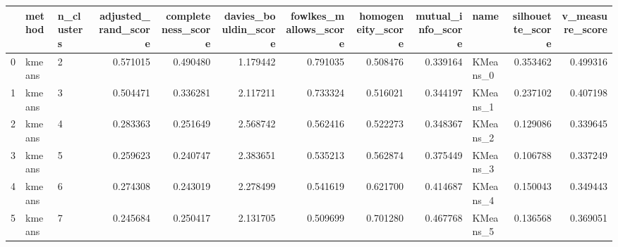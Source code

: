\begin{tabular}{lllrrrrrrlrr}
\toprule
{} &  method & n\_clusters &  adjusted\_rand\_score &  completeness\_score &  davies\_bouldin\_score &  fowlkes\_mallows\_score &  homogeneity\_score &  mutual\_info\_score &      name &  silhouette\_score &  v\_measure\_score \\
\midrule
0 &  kmeans &          2 &             0.571015 &            0.490480 &              1.179442 &               0.791035 &           0.508476 &           0.339164 &  KMeans\_0 &          0.353462 &         0.499316 \\
1 &  kmeans &          3 &             0.504471 &            0.336281 &              2.117211 &               0.733324 &           0.516021 &           0.344197 &  KMeans\_1 &          0.237102 &         0.407198 \\
2 &  kmeans &          4 &             0.283363 &            0.251649 &              2.568742 &               0.562416 &           0.522273 &           0.348367 &  KMeans\_2 &          0.129086 &         0.339645 \\
3 &  kmeans &          5 &             0.259623 &            0.240747 &              2.383651 &               0.535213 &           0.562874 &           0.375449 &  KMeans\_3 &          0.106788 &         0.337249 \\
4 &  kmeans &          6 &             0.274308 &            0.243019 &              2.278499 &               0.541619 &           0.621700 &           0.414687 &  KMeans\_4 &          0.150043 &         0.349443 \\
5 &  kmeans &          7 &             0.245684 &            0.250417 &              2.131705 &               0.509699 &           0.701280 &           0.467768 &  KMeans\_5 &          0.136568 &         0.369051 \\
\bottomrule
\end{tabular}
